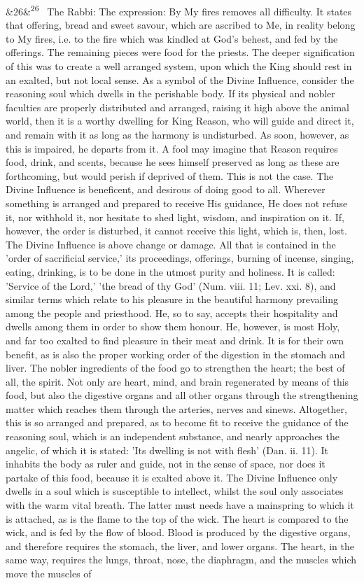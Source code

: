 \documentclass[12pt]{article}
\newcommand{\para}[1][]{\par\noindent\ifx&#1&\else\textsuperscript{\footnotesize #1}~\fi}
\begin{document}
\para[26] The Rabbi: The expression: By My fires removes all difficulty. It states that offering, bread and sweet savour, which are ascribed to Me, in reality belong to My fires, i.e. to the fire which was kindled at God's behest, and fed by the offerings. The remaining pieces were food for the priests. The deeper signification of this was to create a well arranged system, upon which the King should rest in an exalted, but not local sense. As a symbol of the Divine Influence, consider the reasoning soul which dwells in the perishable body. If its physical and nobler faculties are properly distributed and arranged, raising it high above the animal world, then it is a worthy dwelling for King Reason, who will guide and direct it, and remain with it as long as the harmony is undisturbed. As soon, however, as this is impaired, he departs from it. A fool may imagine that Reason requires food, drink, and scents, because he sees himself preserved as long as these are forthcoming, but would perish if deprived of them. This is not the case. The Divine Influence is beneficent, and desirous of doing good to all. Wherever something is arranged and prepared to receive His guidance, He does not refuse it, nor withhold it, nor hesitate to shed light, wisdom, and inspiration on it. If, however, the order is disturbed, it cannot receive this light, which is, then, lost. The Divine Influence is above change or damage. All that is contained in the 'order of sacrificial service,' its proceedings, offerings, burning of incense, singing, eating, drinking, is to be done in the utmost purity and holiness. It is called: 'Service of the Lord,' 'the bread of thy God' (Num. viii. 11; Lev. xxi. 8), and similar terms which relate to his pleasure in the beautiful harmony prevailing among the people and priesthood. He, so to say, accepts their hospitality and dwells among them in order to show them honour. He, however, is most Holy, and far too exalted to find pleasure in their meat and drink. It is for their own benefit, as is also the proper working order of the digestion in the stomach and liver. The nobler ingredients of the food go to strengthen the heart; the best of all, the spirit. Not only are heart, mind, and brain regenerated by means of this food, but also the digestive organs and all other organs through the strengthening matter which reaches them through the arteries, nerves and sinews. Altogether, this is so arranged and prepared, as to become fit to receive the guidance of the reasoning soul, which is an independent substance, and nearly approaches the angelic, of which it is stated: 'Its dwelling is not with flesh' (Dan. ii. 11). It inhabits the body as ruler and guide, not in the sense of space, nor does it partake of this food, because it is exalted above it. The Divine Influence only dwells in a soul which is susceptible to intellect, whilst the soul only associates with the warm vital breath. The latter must needs have a mainspring to which it is attached, as is the flame to the top of the wick. The heart is compared to the wick, and is fed by the flow of blood. Blood is produced by the digestive organs, and therefore requires the stomach, the liver, and lower organs. The heart, in the same way, requires the lungs, throat, nose, the diaphragm, and the muscles which move the muscles of 
\end{document}
